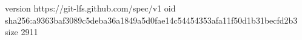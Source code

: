 version https://git-lfs.github.com/spec/v1
oid sha256:a9363baf3089c5deba36a1849a5d0fae14c54454353afa11f50d1b31becfd2b3
size 2911
